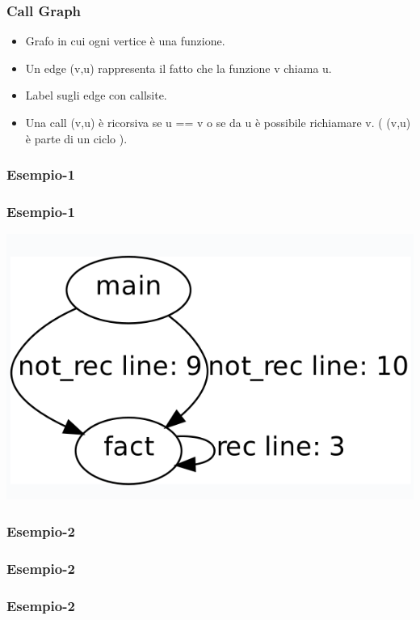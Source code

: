 \documentclass{beamer}
\begin{document}
\begin{frame}
\frametitle{Call Graph}
\begin{itemize}
\item Grafo in cui ogni vertice è una funzione.
\item Un edge (v,u) rappresenta il fatto che la funzione v chiama u.
\item Label sugli edge con callsite.
\item Una call (v,u) è ricorsiva se u == v o se da u è possibile richiamare v. ( (v,u) è parte di un ciclo ).
\end{itemize}
\end{frame}





\begin{frame}
\frametitle{Esempio-1}

\end{frame}

\begin{frame}
\frametitle{Esempio-1}
\includegraphics[scale=0.5]{graph3.png}
\end{frame}

\begin{frame}
\frametitle{Esempio-2}

\end{frame}

\begin{frame}
\frametitle{Esempio-2}

\end{frame}

\begin{frame}
\frametitle{Esempio-2}

\end{frame}
\end{document}
